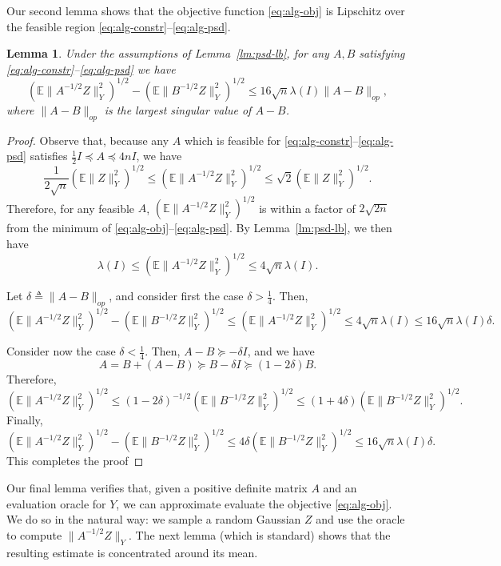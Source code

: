\documentclass[11pt]{article}
\newtheorem{lemma}[theorem]{Lemma}
\newcommand{\E}{\mathbb{E}}
\newcommand{\eqdef}{\triangleq}
\begin{document}
Our second lemma shows that the objective function \eqref{eq:alg-obj}
is Lipschitz over the feasible region
\eqref{eq:alg-constr}--\eqref{eq:alg-psd}.
\begin{lemma}
  Under the assumptions of Lemma~\ref{lm:psd-lb}, for any $A, B$
  satisfying \eqref{eq:alg-constr}--\eqref{eq:alg-psd} we have
  \[
  (\E\|A^{-1/2}Z\|_Y^2)^{1/2} -   (\E\|B^{-1/2}Z\|_Y^2)^{1/2} \le 
  16\sqrt{n}\lambda(I) \|A  - B\|_{op},
  \]
  where $\|A - B\|_{op}$ is the largest singular value of $A-B$.
\end{lemma}
\begin{proof}
  Observe that, because any $A$ which is feasible for
  \eqref{eq:alg-constr}--\eqref{eq:alg-psd} satisfies $\frac12 I
  \preceq A \preceq 4nI$, we have
  \[
  \frac{1}{2\sqrt{n}}(\E\|Z\|_Y^2)^{1/2} 
  \le (\E\|A^{-1/2}Z\|_Y^2)^{1/2}  \le \sqrt{2} (\E\|Z\|_Y^2)^{1/2}. 
  \]
  Therefore, for any feasible $A$, $(\E\|A^{-1/2}Z\|_Y^2)^{1/2}$ is
  within a factor of $2\sqrt{2n}$ from the minimum of
  \eqref{eq:alg-obj}--\eqref{eq:alg-psd}. By Lemma~\ref{lm:psd-lb}, we
  then have
  \[
  \lambda(I)\le (\E\|A^{-1/2}Z\|_Y^2)^{1/2}
  \le 4 \sqrt{n} \lambda(I).
  \]
  
  Let $\delta \eqdef \|A - B\|_{op}$, and consider first the case
  $\delta > \frac14$.  Then, 
  \[
  (\E\|A^{-1/2}Z\|_Y^2)^{1/2} -   (\E\|B^{-1/2}Z\|_Y^2)^{1/2} 
  \le 
  (\E\|A^{-1/2}Z\|_Y^2)^{1/2} \le 
  4 \sqrt{n} \lambda(I)
  \le 16 \sqrt{n} \lambda(I) \delta.
  \]

  Consider now the case $\delta < \frac14$. Then, $A - B \succeq
  -\delta I$, and we have
  \[
  A = B + (A-B) \succeq B - \delta I \succeq (1 - 2\delta) B.
  \]
  Therefore, 
  \[
  (\E\|A^{-1/2}Z\|_Y^2)^{1/2} 
  \le (1-2\delta)^{-1/2} (\E\|B^{-1/2}Z\|_Y^2)^{1/2}
  \le (1+4\delta) (\E\|B^{-1/2}Z\|_Y^2)^{1/2}.
  \]
  Finally,
  \[
  (\E\|A^{-1/2}Z\|_Y^2)^{1/2} -   (\E\|B^{-1/2}Z\|_Y^2)^{1/2} 
  \le
  4\delta (\E\|B^{-1/2}Z\|_Y^2)^{1/2} 
  \le
  16\sqrt{n} \lambda(I) \delta .
  \]
  This completes the proof
\end{proof}

Our final lemma verifies that, given a positive definite matrix $A$
and an evaluation oracle for $Y$, we can approximate evaluate the objective
\eqref{eq:alg-obj}. We do so in the natural way: we sample a random
Gaussian $Z$ and use the oracle to compute $\|A^{-1/2}Z\|_Y$. The next
lemma (which is standard) shows that the resulting estimate is
concentrated around its mean. 
\end{document}
